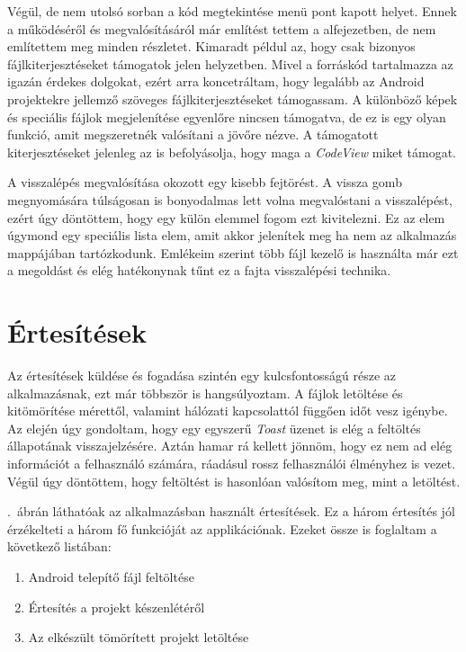 \documentclass{thesis-ekf}
\theoremstyle{definition}
\theoremstyle{remark}
\begin{document}
Végül, de nem utolsó sorban a kód megtekintése menü pont kapott helyet.
Ennek a működéséről és megvalósításáról már említést tettem a  alfejezetben, de nem említettem meg minden részletet.
Kimaradt példul az, hogy csak bizonyos fájlkiterjesztéseket támogatok jelen helyzetben.
Mivel a forráskód tartalmazza az igazán érdekes dolgokat, ezért arra koncetráltam, hogy legalább az Android projektekre jellemző szöveges fájlkiterjesztéseket támogassam.
A különböző képek és speciális fájlok megjelenítése egyenlőre nincsen támogatva, de ez is egy olyan funkció, amit megszeretnék valósítani a jövőre nézve.
A támogatott kiterjesztéseket jelenleg az is befolyásolja, hogy maga a \emph{CodeView} miket támogat.

A visszalépés megvalósítása okozott egy kisebb fejtörést.
A vissza gomb megnyomására túlságosan is bonyodalmas lett volna megvalóstani a visszalépést, ezért úgy döntöttem, hogy egy külön elemmel fogom ezt kivitelezni.
Ez az elem úgymond egy speciális lista elem, amit akkor jelenítek meg ha nem az alkalmazás mappájában tartózkodunk.
Emlékeim szerint több fájl kezelő is használta már ezt a megoldást és elég hatékonynak tűnt ez a fajta visszalépési technika.

\section{Értesítések}\label{ertesitesek}

Az értesítések küldése és fogadása szintén egy kulcsfontosságú része az alkalmazásnak, ezt már többször is hangsúlyoztam.
A fájlok letöltése és kitömörítése mérettől, valamint hálózati kapcsolattól függően időt vesz igénybe.
Az elején úgy gondoltam, hogy egy egyszerű \emph{Toast} üzenet is elég a feltöltés állapotának visszajelzésére.
Aztán hamar rá kellett jönnöm, hogy ez nem ad elég információt a felhasználó számára, ráadásul rossz felhasználói élményhez is vezet.
Végül úgy döntöttem, hogy feltöltést is hasonlóan valósítom meg, mint a letöltést.

.~ábrán láthatóak az alkalmazásban használt értesítések.
Ez a három értesítés jól érzékelteti a három fő funkcióját az applikációnak.
Ezeket össze is foglaltam a következő listában:

\begin{enumerate}
	\item Android telepítő fájl feltöltése
	\item Értesítés a projekt készenlétéről
	\item Az elkészült tömörített projekt letöltése
\end{enumerate}
\end{document}
